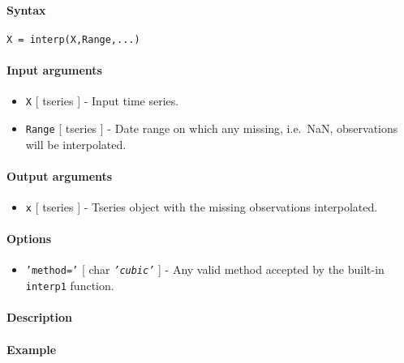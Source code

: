 


	\paragraph{Syntax}

\begin{verbatim}
X = interp(X,Range,...)
\end{verbatim}

\paragraph{Input arguments}

\begin{itemize}
\item
  \texttt{X} {[} tseries {]} - Input time series.
\item
  \texttt{Range} {[} tseries {]} - Date range on which any missing,
  i.e.~NaN, observations will be interpolated.
\end{itemize}

\paragraph{Output arguments}

\begin{itemize}
\itemsep1pt\parskip0pt
\item
  \texttt{x} {[} tseries {]} - Tseries object with the missing
  observations interpolated.
\end{itemize}

\paragraph{Options}

\begin{itemize}
\itemsep1pt\parskip0pt
\item
  \texttt{'method='} {[} char \textbar{} \emph{\texttt{'cubic'}} {]} -
  Any valid method accepted by the built-in \texttt{interp1} function.
\end{itemize}

\paragraph{Description}

\paragraph{Example}


